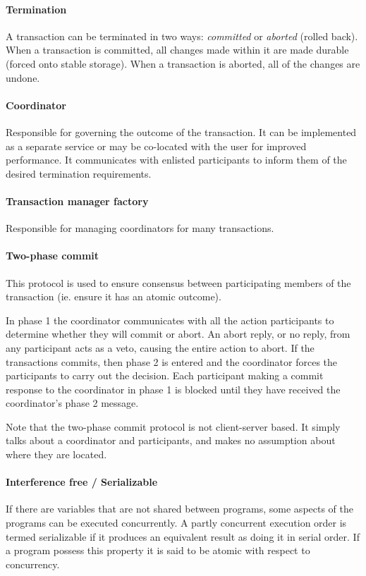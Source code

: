 \paragraph{Termination} A transaction can be terminated in two ways: \textit{committed} or \textit{aborted} (rolled back). When a transaction is committed, all changes made within it are made durable (forced onto stable storage). When a transaction is aborted, all of the changes are undone.

\paragraph{Coordinator} Responsible for governing the outcome of the transaction. It can be implemented as a separate service or may be co-located with the user for improved performance. It communicates with enlisted participants to inform them of the desired termination requirements.

\paragraph{Transaction manager factory} Responsible for managing coordinators for many transactions.

\paragraph{Two-phase commit} This protocol is used to ensure consensus between participating members of the transaction (ie. ensure it has an atomic outcome).

In phase 1 the coordinator communicates with all the action participants to determine whether they will commit or abort. An abort reply, or no reply, from any participant acts as a veto, causing the entire action to abort. If the transactions commits, then phase 2 is entered and the coordinator forces the participants to carry out the decision. Each participant making a commit response to the coordinator in phase 1 is blocked until they have received the coordinator's phase 2 message.

Note that the two-phase commit protocol is not client-server based. It simply talks about a coordinator and participants, and makes no assumption about where they are located.


\paragraph{Interference free / Serializable} If there are variables that are not shared between programs, some aspects of the programs can be executed concurrently. A partly concurrent execution order is termed serializable if it produces an equivalent result as doing it in serial order. If a program possess this property it is said to be atomic with respect to concurrency.

